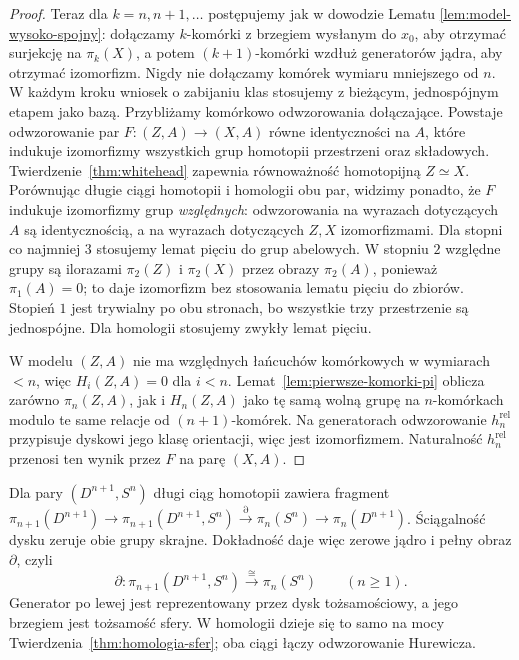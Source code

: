 \begin{proof}
Teraz dla $k=n,n+1,\ldots$
postępujemy jak w
dowodzie Lematu
\ref{lem:model-wysoko-spojny}:
dołączamy $k$-komórki
z brzegiem wysłanym
do $x_0$, aby
otrzymać surjekcję
na $\pi_k(X)$,
a potem
$(k+1)$-komórki
wzdłuż generatorów
jądra, aby
otrzymać izomorfizm.
Nigdy nie dołączamy
komórek wymiaru
mniejszego od $n$.
W każdym kroku wniosek o zabijaniu klas stosujemy z bieżącym,
jednospójnym etapem jako bazą. Przybliżamy komórkowo odwzorowania dołączające.
Powstaje odwzorowanie par $F:(Z,A)\to(X,A)$
równe identyczności na $A$, które
indukuje izomorfizmy
wszystkich grup
homotopii przestrzeni
oraz składowych.
Twierdzenie~\ref{thm:whitehead}
zapewnia równoważność
homotopijną $Z\simeq X$.
Porównując długie ciągi
homotopii i homologii
obu par, widzimy
ponadto, że $F$
indukuje izomorfizmy
grup \emph{względnych}:
odwzorowania na wyrazach dotyczących $A$ są identycznością,
a na wyrazach dotyczących $Z,X$ izomorfizmami.
Dla stopni co najmniej $3$ stosujemy lemat pięciu do grup abelowych.
W stopniu $2$ względne grupy są ilorazami $\pi_2(Z)$ i $\pi_2(X)$
przez obrazy $\pi_2(A)$, ponieważ $\pi_1(A)=0$;
to daje izomorfizm bez stosowania lematu pięciu do zbiorów.
Stopień $1$ jest trywialny po obu stronach, bo wszystkie trzy przestrzenie
są jednospójne. Dla homologii stosujemy zwykły lemat pięciu.

W modelu $(Z,A)$
nie ma względnych
łańcuchów komórkowych
w wymiarach $<n$,
więc $H_i(Z,A)=0$
dla $i<n$.
Lemat~\ref{lem:pierwsze-komorki-pi}
oblicza zarówno
$\pi_n(Z,A)$,
jak i $H_n(Z,A)$
jako tę samą
wolną grupę na
$n$-komórkach
modulo te same
relacje od
$(n+1)$-komórek.
Na generatorach
odwzorowanie $h_n^{\mathrm{rel}}$
przypisuje dyskowi
jego klasę orientacji,
więc jest izomorfizmem.
Naturalność
$h_n^{\mathrm{rel}}$
przenosi ten wynik
przez $F$
na parę $(X,A)$.
\end{proof}

\begin{przyklad}
\label{prz:pi-dysk-brzeg}
Dla pary $(D^{n+1},S^n)$
długi ciąg homotopii zawiera fragment
$\pi_{n+1}(D^{n+1})\to\pi_{n+1}(D^{n+1},S^n)
\xrightarrow{\partial}\pi_n(S^n)\to\pi_n(D^{n+1})$.
Ściągalność dysku zeruje obie grupy skrajne.
Dokładność daje więc zerowe jądro i pełny obraz $\partial$, czyli
\[
 \partial:
 \pi_{n+1}(D^{n+1},S^n)
 \xrightarrow{\ \cong\ }
 \pi_n(S^n)
 \qquad(n\geq1).
\]
Generator po lewej jest reprezentowany przez dysk tożsamościowy,
a jego brzegiem jest
tożsamość sfery.
W homologii dzieje się
to samo na mocy
Twierdzenia~\ref{thm:homologia-sfer};
oba ciągi łączy odwzorowanie
Hurewicza.
\end{przyklad}

